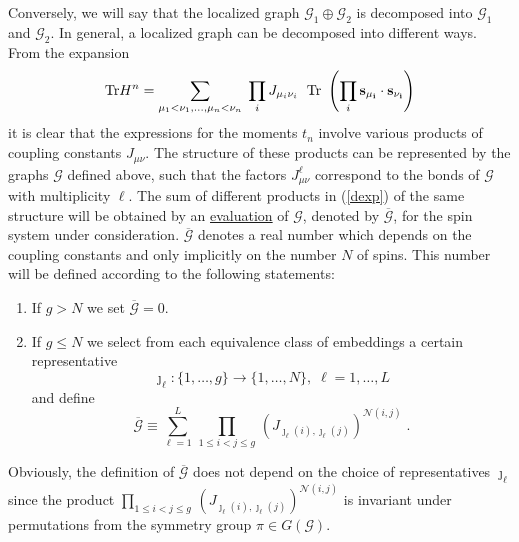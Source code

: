 \documentclass[aps,twocolumn,groupedaddress]{revtex4}
\begin{document}
Conversely, we will say that the localized graph ${\mathcal
G}_1\oplus {\mathcal G}_2$ is decomposed into ${\mathcal
G}_1$ and ${\mathcal G}_2$.
In general, a localized graph can be decomposed into different ways.\\

From the expansion
\begin{equation}\label{dexp}
\mbox{Tr}H^n=\sum_{\mu_1<\nu_1,\ldots,\mu_n<\nu_n}\;\prod_{i}J_{\mu_i
\nu_i}\;\mbox{ Tr }
\left(\prod_{i}\bf{s}_{\mu_i}\cdot\bf{s}_{\nu_i}\right)
\end{equation}
it is clear that the expressions for the moments $t_n$ involve
various products of coupling constants $J_{\mu\nu}$. The structure
of these products can be represented by the graphs ${\mathcal G}$
defined above, such that the factors $J_{\mu\nu}^\ell$ correspond to
the bonds of ${\mathcal G}$ with multiplicity $\ell$. The sum of
different products in (\ref{dexp}) of the same structure will be
obtained by an \underline{evaluation} of ${\mathcal G}$, denoted by
$\overline{\mathcal G}$, for the spin system under consideration.
$\overline{\mathcal G}$ denotes a real number which depends on the
coupling constants and only implicitly on the number $N$ of spins.
This number will be defined according to the following statements:
\begin{enumerate}
\item If $g>N$ we set $\overline{\mathcal G}=0$.\\
\item If $g\le N$ we select from each equivalence class of embeddings
a certain representative
\begin{equation}\label{dembl}
\jmath_\ell:\{1,\ldots,g\}\longrightarrow
\{1,\ldots,N\},\;\ell=1,\ldots,L
\end{equation}
and define
\begin{equation}\label{d2}
\overline{\mathcal G}\equiv \sum_{\ell=1}^L\, \prod_{1\le i<j\le g}
\, \left( J_{\jmath_\ell(i),\jmath_\ell(j)} \right)^{{\mathcal
N}(i,j)} \;.
\end{equation}
\end{enumerate}
Obviously, the definition of $\overline{\mathcal G}$ does not depend
on the choice of representatives $\jmath_\ell$ since the product
$\prod_{1\le i<j\le g}
\,\left(J_{\jmath_\ell(i),\jmath_\ell(j)}\right)^{{\mathcal
N}(i,j)}$ is invariant under
permutations from the symmetry group $\pi\in G({\mathcal G})$.\\
\end{document}
